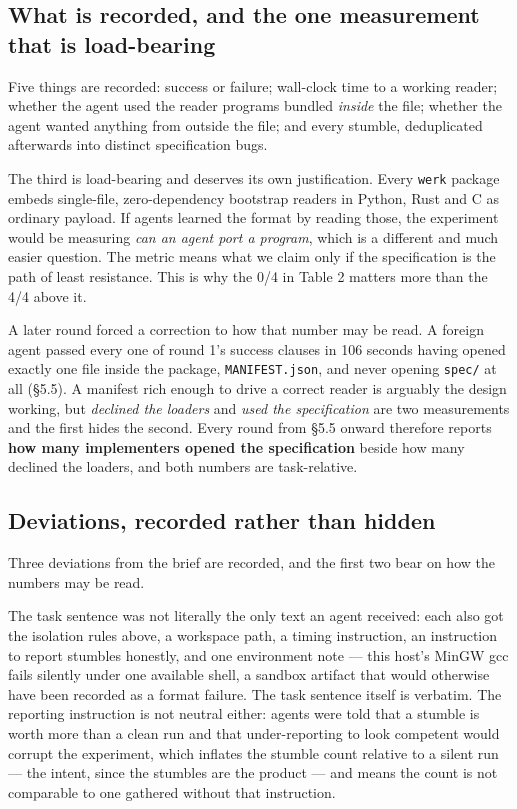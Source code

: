 \documentclass[10pt,twocolumn,letterpaper]{article}
\newcommand{\code}[1]{\texttt{\small #1}}
\begin{document}
\subsection{What is recorded, and the one measurement that is load-bearing}

Five things are recorded: success or failure; wall-clock time to a working reader; whether the agent used the reader programs bundled \emph{inside} the file; whether the agent wanted anything from outside the file; and every stumble, deduplicated afterwards into distinct specification bugs.

The third is load-bearing and deserves its own justification. Every \code{werk} package embeds single-file, zero-dependency bootstrap readers in Python, Rust and C as ordinary payload. If agents learned the format by reading those, the experiment would be measuring \emph{can an agent port a program}, which is a different and much easier question. The metric means what we claim only if the specification is the path of least resistance. This is why the 0/4 in Table 2 matters more than the 4/4 above it.

A later round forced a correction to how that number may be read. A foreign agent passed every one of round 1's success clauses in 106 seconds having opened exactly one file inside the package, \code{MANIFEST.json}, and never opening \code{spec/} at all (\S5.5). A manifest rich enough to drive a correct reader is arguably the design working, but \emph{declined the loaders} and \emph{used the specification} are two measurements and the first hides the second. Every round from \S5.5 onward therefore reports \textbf{how many implementers opened the specification} beside how many declined the loaders, and both numbers are task-relative.

\subsection{Deviations, recorded rather than hidden}

Three deviations from the brief are recorded, and the first two bear on how the numbers may be read.

The task sentence was not literally the only text an agent received: each also got the isolation rules above, a workspace path, a timing instruction, an instruction to report stumbles honestly, and one environment note --- this host's MinGW gcc fails silently under one available shell, a sandbox artifact that would otherwise have been recorded as a format failure. The task sentence itself is verbatim. The reporting instruction is not neutral either: agents were told that a stumble is worth more than a clean run and that under-reporting to look competent would corrupt the experiment, which inflates the stumble count relative to a silent run --- the intent, since the stumbles are the product --- and means the count is not comparable to one gathered without that instruction.
\end{document}
